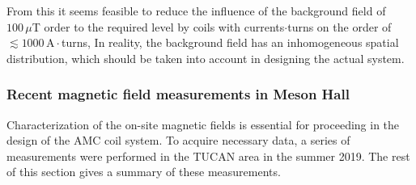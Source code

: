From this it seems feasible to reduce the influence of the background field of $100\,\mu$T order to the required level by coils with currents$\cdot$turns on the order of  $\lesssim 1000\,\mathrm{A}\cdot$turns, In reality, the background field has an inhomogeneous spatial distribution, which should be taken into account in designing the actual system. 




\subsubsection*{Recent magnetic field measurements in Meson Hall}\label{sec:amc_recent}
Characterization of the on-site magnetic fields is essential for proceeding in the design of the AMC coil system. To acquire necessary data, a series of measurements were performed in the TUCAN area in the summer 2019. The rest of this section gives a summary of these measurements.

